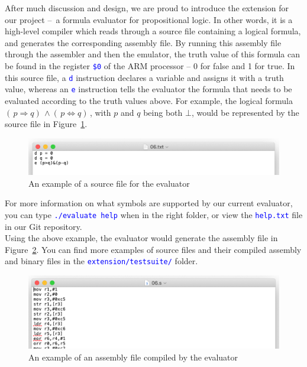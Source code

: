 \documentclass[11pt]{article}
\newcommand{\code}[1]{\mbox{\texttt{\textcolor{blue}{#1}}}}
\begin{document}
After much discussion and design, we are proud to introduce the extension for our project – a formula evaluator for propositional logic. In other words, it is a high-level compiler which reads through a source file containing a logical formula, and generates the corresponding assembly file. By running this assembly file through the assembler and then the emulator, the truth value of this formula can be found in the register \code{\$0} of the ARM processor – 0 for false and 1 for true. In this source file, a \code{d} instruction declares a variable and assigns it with a truth value, whereas an \code{e} instruction tells the evaluator the formula that needs to be evaluated according to the truth values above. For example, the logical formula \(( \,p \Rightarrow q) \, \land ( \,p \Leftrightarrow q) \,\), with \(p\) and \(q\) being both \(\bot\), would be represented by the source file in Figure~\ref{fig:evaluator_sample_source}.

\begin{figure}[h]
\centering
\includegraphics[width=\linewidth]{evaluator_sample_source}
\caption{An example of a source file for the evaluator}
\label{fig:evaluator_sample_source}
\end{figure}

For more information on what symbols are supported by our current evaluator, you can type \code{./evaluate help} when in the right folder, or view the \code{help.txt} file in our Git repository.\\

Using the above example, the evaluator would generate the assembly file in Figure~\ref{fig:evaluator_sample_assembly}. You can find more examples of source files and their compiled assembly and binary files in the \code{extension/testsuite/} folder.\\

\begin{figure}[h]
\centering
\includegraphics[width=\linewidth]{evaluator_sample_assembly}
\caption{An example of an assembly file compiled by the evaluator}
\label{fig:evaluator_sample_assembly}
\end{figure}
\end{document}

